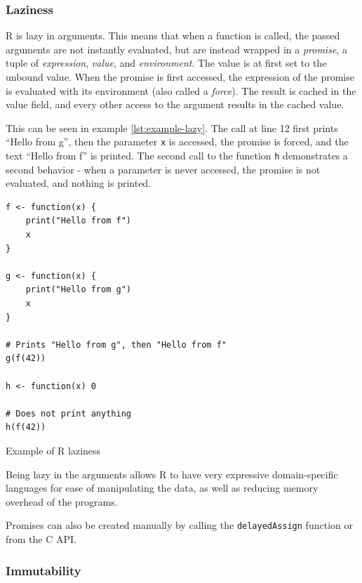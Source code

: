 \subsubsection*{Laziness}

R is lazy in arguments. This means that when a function is called, the passed arguments are not instantly evaluated, but are instead wrapped in a \textit{promise}, a tuple of \textit{expression}, \textit{value}, and \textit{environment}. The value is at first set to the unbound value. When the promise is first accessed, the expression of the promise is evaluated with its environment (also called a \textit{force}). The result is cached in the value field, and every other access to the argument results in the cached value.

This can be seen in example \ref{lst:example-lazy}. The call at line 12 first prints \enquote{Hello from g}, then the parameter \texttt{x} is accessed, the promise is forced, and the text \enquote{Hello from f} is printed. The second call to the function \texttt{h} demonstrates a second behavior - when a parameter is never accessed, the promise is not evaluated, and nothing is printed.

\begin{listing}[h!]
	\centering
	\begin{verbatim}
f <- function(x) {
    print("Hello from f")
    x
}

g <- function(x) {
    print("Hello from g")
    x
}

# Prints "Hello from g", then "Hello from f"
g(f(42))

h <- function(x) 0

# Does not print anything
h(f(42))
  \end{verbatim}
	\caption{Example of R laziness}\label{lst:example-lazy}
\end{listing}

Being lazy in the arguments allows R to have very expressive domain-specific languages for ease of manipulating the data, as well as reducing memory overhead of the programs.

Promises can also be created manually by calling the \texttt{delayedAssign} function or from the C API.

\subsubsection*{Immutability}

